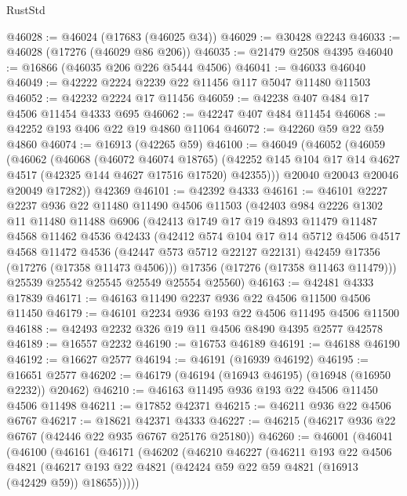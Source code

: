 \begin{lexlean}{RustStd}
\begin{coremodule}
@46028 := @46024 (@17683 (@46025 @34))
@46029 := @30428 @2243
@46033 := @46028 (@17276 (@46029 @86 @206))
@46035 := @21479 @2508 @4395
@46040 := @16866 (@46035 @206 @226 @5444 @4506)
@46041 := @46033 @46040
@46049 := @42222 @2224 @2239 @22 @11456 @117 @5047 @11480 @11503
@46052 := @42232 @2224 @17 @11456
@46059 := @42238 @407 @484 @17 @4506 @11454 @4333 @695
@46062 := @42247 @407 @484 @11454
@46068 := @42252 @193 @406 @22 @19 @4860 @11064
@46072 := @42260 @59 @22 @59 @4860
@46074 := @16913 (@42265 @59)
@46100 := @46049
    (@46052
      (@46059
        (@46062
          (@46068
            (@46072 @46074 @18765)
            (@42252 @145 @104 @17 @14 @4627 @4517 (@42325 @144 @4627 @17516 @17520) @42355)))
        @20040
        @20043
        @20046
        @20049
        @17282))
    @42369
@46101 := @42392 @4333
@46161 := @46101
    @2227
    @2237
    @936
    @22
    @11480
    @11490
    @4506
    @11503
    (@42403
      @984
      @2226
      @1302
      @11
      @11480
      @11488
      @6906
      (@42413
        @1749
        @17
        @19
        @4893
        @11479
        @11487
        @4568
        @11462
        @4536
        @42433
        (@42412
          @574
          @104
          @17
          @14
          @5712
          @4506
          @4517
          @4568
          @11472
          @4536
          (@42447 @573 @5712 @22127 @22131)
          @42459
          @17356
          (@17276 (@17358 @11473 @4506)))
        @17356
        (@17276 (@17358 @11463 @11479)))
      @25539
      @25542
      @25545
      @25549
      @25554
      @25560)
@46163 := @42481 @4333 @17839
@46171 := @46163 @11490 @2237 @936 @22 @4506 @11500 @4506 @11450
@46179 := @46101 @2234 @936 @193 @22 @4506 @11495 @4506 @11500
@46188 := @42493 @2232 @326 @19 @11 @4506 @8490 @4395 @2577 @42578
@46189 := @16557 @2232
@46190 := @16753 @46189
@46191 := @46188 @46190
@46192 := @16627 @2577
@46194 := @46191 (@16939 @46192)
@46195 := @16651 @2577
@46202 := @46179 (@46194 (@16943 @46195) (@16948 (@16950 @2232)) @20462)
@46210 := @46163 @11495 @936 @193 @22 @4506 @11450 @4506 @11498
@46211 := @17852 @42371
@46215 := @46211 @936 @22 @4506 @6767
@46217 := @18621 @42371 @4333
@46227 := @46215 (@46217 @936 @22 @6767 (@42446 @22 @935 @6767 @25176 @25180))
@46260 := @46001
    (@46041
      (@46100
        (@46161
          (@46171
            (@46202
              (@46210
                @46227
                (@46211
                  @193
                  @22
                  @4506
                  @4821
                  (@46217 @193 @22 @4821 (@42424 @59 @22 @59 @4821 (@16913 (@42429 @59)) @18655)))))

\end{coremodule}
\end{lexlean}
